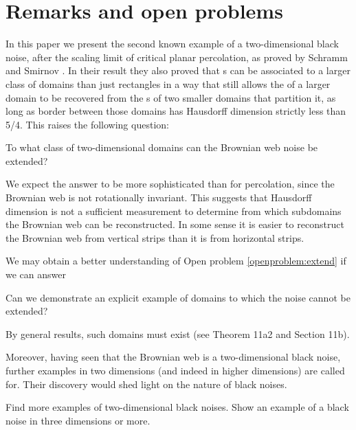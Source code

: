{
\section{Remarks and open problems}

\label{sec:open-problems}

In this paper we present the second known example of a two-dimensional
black noise, after the scaling limit of critical planar percolation,
as proved by Schramm and Smirnov \cite{schramm-smirnov}.  In their result they also proved
that \sigfield{}s can be associated to a larger class of domains than
just rectangles in a way that still allows the \sigfield{} of a larger
domain to be recovered from the \sigfield{}s of two smaller domains
that partition it, as long as border between those domains has
Hausdorff dimension strictly less than 5/4.
This raises the following question:

\begin{openproblem}
  \label{openproblem:extend}
  To what class of two-dimensional domains can the Brownian web noise be extended?
\end{openproblem}

We expect the answer to be more sophisticated than for percolation,
since the Brownian web is not rotationally invariant.  
This suggests that Hausdorff dimension is not a sufficient measurement
to determine from which subdomains the Brownian web can be
reconstructed.  In some sense it is easier to reconstruct the Brownian
web from vertical strips than it is from horizontal strips.

We may obtain a better understanding of Open problem
\ref{openproblem:extend} if we can answer

\begin{openproblem}
  Can we demonstrate an explicit example of domains to which the noise
  cannot be extended?
\end{openproblem}

By general results, such domains must exist (see
\cite{tsirelson-nonclassical-stochastic-flows} Theorem 11a2 and
Section 11b).

Moreover, having seen that the Brownian web is a two-dimensional black
noise, further examples in two dimensions (and indeed in higher
dimensions) are called for.  Their
discovery would shed light on the nature of black noises.

\begin{openproblem}
  Find more examples of two-dimensional black noises.  Show an example
  of a black noise in three dimensions or more.
\end{openproblem}
}
